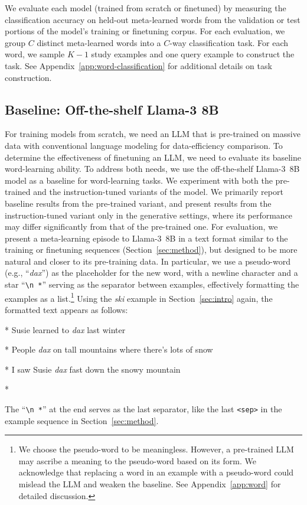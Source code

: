 \documentclass{article}
\begin{document}
We evaluate each model (trained from scratch or finetuned) by measuring the classification accuracy on held-out meta-learned words from the validation or test portions of the model's training or finetuning corpus.
For each evaluation, we group $C$ distinct meta-learned words into a $C$-way classification task. For each word, we sample $K-1$ study examples and one query example to construct the task.
See Appendix~\ref{app:word-classification} for additional details on task construction.

\subsection{Baseline: Off-the-shelf Llama-3 8B}
\label{sec:baseline}
For training models from scratch, we need an LLM that is pre-trained on massive data with conventional language modeling for data-efficiency comparison. To determine the effectiveness of finetuning an LLM, we need to evaluate its baseline word-learning ability.
To address both needs, we use the off-the-shelf \mbox{Llama-3 8B} model as a baseline for word-learning tasks.
We experiment with both the pre-trained and the instruction-tuned variants of the model. We primarily report baseline results from the pre-trained variant, and present results from the instruction-tuned variant only in the generative settings, where its performance may differ significantly from that of the pre-trained one.
For evaluation, we present a meta-learning episode to \mbox{Llama-3 8B} in a text format similar to the training or finetuning sequences (Section~\ref{sec:method}), but designed to be more natural and closer to its pre-training data.
In particular, we use a pseudo-word (e.g., ``\textit{dax}'') as the placeholder for the new word, with a newline character and a star ``\verb|\n *|'' serving as the separator between examples, effectively formatting the examples as a list.\footnote{We choose the pseudo-word to be meaningless. However, a pre-trained LLM may ascribe a meaning to the pseudo-word based on its form. We acknowledge that replacing a word in an example with a pseudo-word could mislead the LLM and weaken the baseline. See Appendix~\ref{app:word} for detailed discussion.}
Using the \emph{ski} example in Section~\ref{sec:intro} again, the formatted text appears as follows:
\begin{displayquote}
 * Susie learned to \textit{dax} last winter

 * People \textit{dax} on tall mountains where there's lots of snow

 * I saw Susie \textit{dax} fast down the snowy mountain

 *
\end{displayquote}
The ``\verb|\n *|'' at the end serves as the last separator, like the last \texttt{<sep>} in the example sequence in Section~\ref{sec:method}.
\end{document}

